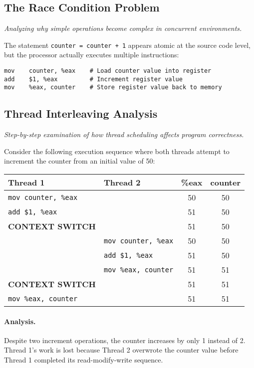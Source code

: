 \documentclass[../../compsys.tex]{subfiles}
\begin{document}
\subsection{The Race Condition Problem}
\textit{Analyzing why simple operations become complex in concurrent environments.}

The statement \texttt{counter = counter + 1} appears atomic at the source code level, but the processor actually executes multiple instructions:

\begin{verbatim}
mov    counter, %eax    # Load counter value into register
add    $1, %eax         # Increment register value
mov    %eax, counter    # Store register value back to memory
\end{verbatim}

\subsection{Thread Interleaving Analysis}
\textit{Step-by-step examination of how thread scheduling affects program correctness.}

Consider the following execution sequence where both threads attempt to increment the counter from an initial value of 50:

\begin{center}
\begin{tabular}{|l|l|c|c|}
\hline
\textbf{Thread 1} & \textbf{Thread 2} & \textbf{\%eax} & \textbf{counter} \\
\hline
\texttt{mov counter, \%eax} & & 50 & 50 \\
\texttt{add \$1, \%eax} & & 51 & 50 \\
\textbf{CONTEXT SWITCH} & & 51 & 50 \\
& \texttt{mov counter, \%eax} & 50 & 50 \\
& \texttt{add \$1, \%eax} & 51 & 50 \\
& \texttt{mov \%eax, counter} & 51 & 51 \\
\textbf{CONTEXT SWITCH} & & 51 & 51 \\
\texttt{mov \%eax, counter} & & 51 & 51 \\
\hline
\end{tabular}
\end{center}

\paragraph{Analysis.} Despite two increment operations, the counter increases by only 1 instead of 2. Thread 1's work is lost because Thread 2 overwrote the counter value before Thread 1 completed its read-modify-write sequence.
\end{document}
